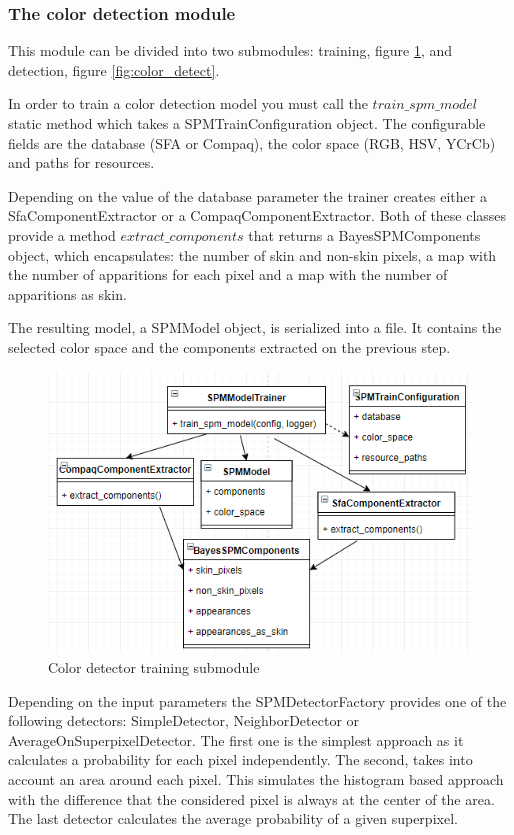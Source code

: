\documentclass[12pt]{report}
\begin{document}
	\subsubsection{The color detection module}
	This module can be divided into two submodules: training, figure \ref{fig:color_train}, and detection, figure \ref{fig:color_detect}.
	
	In order to train a color detection model you must call the $train\_spm\_model$ static method which takes a SPMTrainConfiguration object. The configurable fields are the database (SFA or Compaq), the color space (RGB, HSV, YCrCb) and paths for resources. 
	
	Depending on the value of the database parameter the trainer creates either a SfaComponentExtractor or a CompaqComponentExtractor. Both of these classes provide a method $extract\_components$ that returns a BayesSPMComponents object, which encapsulates: the number of skin and non-skin pixels, a map with the number of apparitions for each pixel and a map with the number of apparitions as skin.
	
	The resulting model, a SPMModel object, is serialized into a file. It contains the selected color space and the components extracted on the previous step.
	
	\begin{figure}[h!]
		\centering
		\includegraphics[]{design/color_train.png}
		\caption{Color detector training submodule}
		\label{fig:color_train}
	\end{figure}
	
	Depending on the input parameters the SPMDetectorFactory provides one of the following detectors: SimpleDetector, NeighborDetector or AverageOnSuperpixelDetector. The first one is the simplest approach as it calculates a probability for each pixel independently. The second, takes into account an area around each pixel. This simulates the histogram based approach with the difference that the considered pixel is always at the center of the area. The last detector calculates the average probability of a given superpixel.
	
\end{document}
